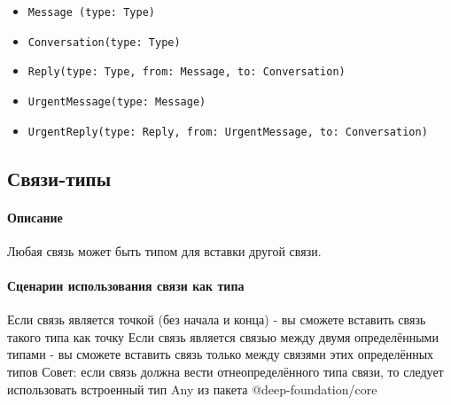 \documentclass{article}
\begin{document}
\begin{itemize}
  \item \texttt{Message (type: Type)}
  \item \texttt{Conversation(type: Type)}
  \item \texttt{Reply(type: Type, from: Message, to: Conversation)}
  \item \texttt{UrgentMessage(type: Message)}
  \item \texttt{UrgentReply(type: Reply, from: UrgentMessage, to: Conversation)}
\end{itemize}

\subsection{Связи-типы}
\paragraph{Описание}
Любая связь может быть типом для вставки другой связи. 
\paragraph{Сценарии использования связи как типа}
Если связь является точкой (без начала и конца) - вы сможете вставить связь такого типа как точку
Если связь является связью между двумя определёнными типами - вы сможете вставить связь только между связями этих определённых типов
Совет: если связь должна вести от неопределённого типа связи, то следует использовать встроенный тип Any из пакета @deep-foundation/core
\end{document}
